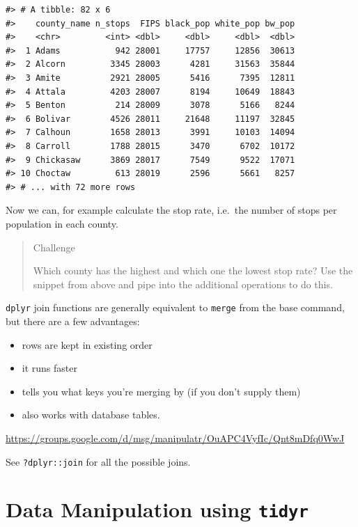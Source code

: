 \documentclass[
]{book}
\providecommand{\tightlist}{%
  \setlength{\itemsep}{0pt}\setlength{\parskip}{0pt}}
\begin{document}
\begin{verbatim}
#> # A tibble: 82 x 6
#>    county_name n_stops  FIPS black_pop white_pop bw_pop
#>    <chr>         <int> <dbl>     <dbl>     <dbl>  <dbl>
#>  1 Adams           942 28001     17757     12856  30613
#>  2 Alcorn         3345 28003      4281     31563  35844
#>  3 Amite          2921 28005      5416      7395  12811
#>  4 Attala         4203 28007      8194     10649  18843
#>  5 Benton          214 28009      3078      5166   8244
#>  6 Bolivar        4526 28011     21648     11197  32845
#>  7 Calhoun        1658 28013      3991     10103  14094
#>  8 Carroll        1788 28015      3470      6702  10172
#>  9 Chickasaw      3869 28017      7549      9522  17071
#> 10 Choctaw         613 28019      2596      5661   8257
#> # ... with 72 more rows
\end{verbatim}

Now we can, for example calculate the stop rate, i.e.~the number of stops per population in each county.

\begin{quote}
Challenge

Which county has the highest and which one the lowest stop rate?
Use the snippet from above and pipe into the additional operations
to do this.
\end{quote}

\texttt{dplyr} join functions are generally equivalent to \texttt{merge} from the base command, but there are a few advantages:

\begin{itemize}
\tightlist
\item
  rows are kept in existing order
\item
  it runs faster
\item
  tells you what keys you're merging by (if you don't supply them)
\item
  also works with database tables.
\end{itemize}

\url{https://groups.google.com/d/msg/manipulatr/OuAPC4VyfIc/Qnt8mDfq0WwJ}

See \texttt{?dplyr::join} for all the possible joins.

\hypertarget{tidyr}{%
\chapter{\texorpdfstring{Data Manipulation using \textbf{\texttt{tidyr}}}{Data Manipulation using tidyr}}\label{tidyr}}
\end{document}
